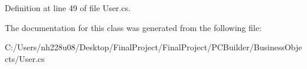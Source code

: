 Definition at line 49 of file User.\+cs.



The documentation for this class was generated from the following file\+:\begin{DoxyCompactItemize}
\item 
C\+:/\+Users/nh228u08/\+Desktop/\+Final\+Project/\+Final\+Project/\+P\+C\+Builder/\+Business\+Objects/User.\+cs\end{DoxyCompactItemize}
